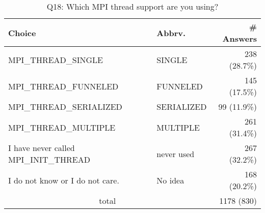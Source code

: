 \begin{table}[htb]%
\begin{center}%
\caption{Q18: Which MPI thread support are you using?}%
\label{tab:Q18-ans}%
\begin{tabular}{l|l|r}%
\hline%
Choice & Abbrv. & \# Answers \\%
\hline%
MPI\_THREAD\_SINGLE & SINGLE & 238 (28.7\%) \\%
MPI\_THREAD\_FUNNELED & FUNNELED & 145 (17.5\%) \\%
MPI\_THREAD\_SERIALIZED & SERIALIZED & 99 (11.9\%) \\%
MPI\_THREAD\_MULTIPLE & MULTIPLE & 261 (31.4\%) \\%
I have never called MPI\_INIT\_THREAD & never used & 267 (32.2\%) \\%
I do not know or I do not care. & No idea & 168 (20.2\%) \\%
\hline%
\multicolumn{2}{c}{total} & 1178 (830)\\%
\hline%
\end{tabular}%
\end{center}%
\end{table}%
